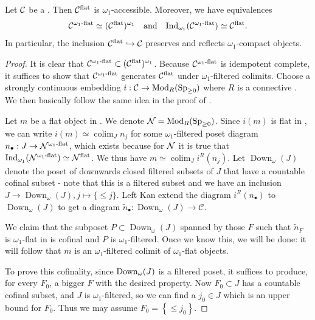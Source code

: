 \documentclass[a4paper,10pt, oneside]{amsart}
\begin{document}
\begin{prop}\label{flatacc}
	Let $\mathcal{C}$ be a \dualaddinfcat. Then $\mathcal{C}^{\mathrm{flat}}$ is $\omega_1$-accessible. Moreover, we have equivalences
	\[
	\mathcal{C}^{\omega_1\text{-}\mathrm{flat}} \simeq (\mathcal{C}^{\mathrm{flat}})^{\omega_1} 
	\quad \text{and} \quad 
	\mathrm{Ind}_{\omega_1}(\mathcal{C}^{\omega_1\text{-}\mathrm{flat}}) \simeq \mathcal{C}^{\mathrm{flat}}.
	\]
	In particular, the inclusion $\mathcal{C}^{\mathrm{flat}} \hookrightarrow \mathcal{C}$ preserves and reflects $\omega_1$-compact objects.
\end{prop}
\begin{proof}
	It is clear that $\mathcal{C}^{\omega_1\text{-}\mathrm{flat}}\subset(\mathcal{C}^{\mathrm{flat}})^{\omega_1} $. 
	Because $\mathcal{C}^{\omega_1\text{-}\mathrm{flat}}$ is idempotent complete, it suffices to show that $\mathcal{C}^{\omega_1\text{-}\mathrm{flat}}$ generates $\mathcal{C}^{\mathrm{flat}}$ under $\omega_1$-filtered colimits. Choose a strongly continuous embedding $i:\mathcal{C} \to \operatorname{Mod}_{R}(\operatorname{Sp}_{\geq0})$ where $R$ is a connective \eonering. We then basically follow the same idea in the proof of \cite[Proposition 2.27]{ramzi2024dualizable}.
	
	Let $m$ be a flat object in \mcc. We denote $\mathcal{N}=\operatorname{Mod}_{R}(\operatorname{Sp}_{\geq0})$. Since $i(m)$ is flat in \mcn, we can write $i(m) \simeq \operatorname{colim}_J n_j$ for some $\omega_1$-filtered poset diagram $n_{\bullet}: J \rightarrow \mathcal{N}^{\omega_1\text{-}\mathrm{flat}}$, which exists because for $\mathcal{N}$ it is true that $\mathrm{Ind}_{\omega_1}(\mathcal{N}^{\omega_1\text{-}\mathrm{flat}})\simeq\mathcal{N}^{\mathrm{flat}}$. We thus have $m \simeq \operatorname{colim}_J i^R\left(n_j\right)$. Let $\operatorname{Down}_\omega(J)$ denote the poset of downwards closed filtered subsets of $J$ that have a countable cofinal subset - note that this is a filtered subset and we have an inclusion $J \rightarrow \operatorname{Down}_\omega(J), j \mapsto\{\leq j\}$. Left Kan extend the diagram $i^R\left(n_{\bullet}\right)$ to $\operatorname{Down}_\omega(J)$ to get a diagram $\tilde{n}_{\bullet}: \operatorname{Down}_\omega(J) \rightarrow \mathcal{C}$.
	
	We claim that the subposet $P \subset \operatorname{Down}_\omega(J)$ spanned by those $F$ such that $\tilde{n}_F$ is $\omega_1$-flat in \mcc is cofinal and $P$ is $\omega_1$-filtered. Once we know this, we will be done: it will follow that $m$ is an $\omega_1$-filtered colimit of $\omega_1$-flat objects.
	
	To prove this cofinality, since $\mathrm{Down}_\omega(J)$ is a filtered poset, it suffices to produce, for every $F_0$, a bigger $F$ with the desired property. Now $F_0 \subset J$ has a countable cofinal subset, and $J$ is $\omega_1$-filtered, so we can find a $j_0 \in J$ which is an upper bound for $F_0$. Thus we may assume $F_0=\left\{\leq j_0\right\}$.
	

\end{proof}
\end{document}
